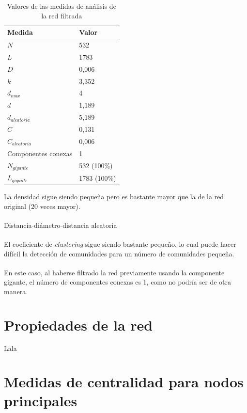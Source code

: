 \begin{table}[H]
	\centering
	\caption{Valores de las medidas de análisis de la red filtrada}
	\label{tab:medidas-filtrada}
	\begin{tabular}{| l | l |}
		\hline
		Medida                & Valor        \\ 
		\hline
		$N$                   & 532          \\
		$L$                   & 1783         \\
		$D$                   & 0,006        \\
		$k$                   & 3,352        \\
		$d_{max}$             & 4            \\
		$d$                   & 1,189        \\
		$d_{aleatoria}$       & 5,189        \\
		$C$                   & 0,131        \\
		$C_{aleatoria}$       & 0,006        \\ 
		Componentes conexas   & 1            \\ 
		$N_{gigante}$         & 532 (100\%)  \\ 
		$L_{gigante}$         & 1783 (100\%) \\ 
		\hline
	\end{tabular}
\end{table}

La densidad sigue siendo pequeña pero es bastante mayor que la de la red original (20 veces mayor).
\\ \\
Distancia-diámetro-distancia aleatoria
\\ \\
El coeficiente de \textit{clustering} sigue siendo bastante pequeño, lo cual puede hacer difícil la detección de comunidades para un número de comunidades pequeña.
\\ \\
En este caso, al haberse filtrado la red previamente usando la componente gigante, el número de componentes conexas es 1, como no podría ser de otra manera.

\section{Propiedades de la red}

Lala

\section{Medidas de centralidad para nodos principales}

